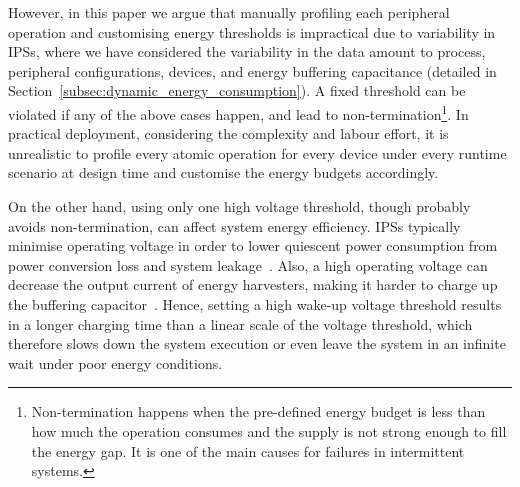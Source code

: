 
However, in this paper we argue that manually profiling each peripheral operation and customising energy thresholds is impractical due to variability in IPSs, where we have considered the variability in the data amount to process, peripheral configurations, devices, and energy buffering capacitance (detailed in Section~\ref{subsec:dynamic_energy_consumption}). 
A fixed threshold can be violated if any of the above cases happen, and lead to non-termination\footnote{Non-termination happens when the pre-defined energy budget is less than how much the operation consumes and the supply is not strong enough to fill the energy gap. It is one of the main causes for failures in intermittent systems. }.
In practical deployment, considering the complexity and labour effort, it is unrealistic to profile every atomic operation for every device under every runtime scenario at design time and customise the energy budgets accordingly. 



On the other hand, using only one high voltage threshold, though probably avoids non-termination, can affect system energy efficiency. 
IPSs typically minimise operating voltage in order to lower quiescent power consumption from power conversion loss and system leakage~\cite{gomez2016dynamic}. 
Also, a high operating voltage can decrease the output current of energy harvesters, making it harder to charge up the buffering capacitor~\cite{pan2017maximize}.
Hence, setting a high wake-up voltage threshold results in a longer charging time than a linear scale of the voltage threshold, which therefore slows down the system execution or even leave the system in an infinite wait under poor energy conditions.



